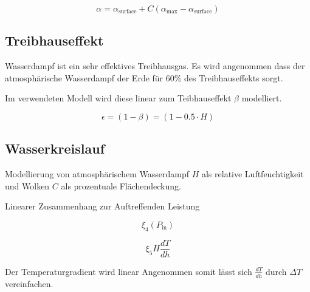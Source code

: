 \begin{refsection}
\begin{equation}
\alpha = \alpha_{\text{surface}} + C(\alpha_{\text{max}} - \alpha_{\text{surface}})
\end{equation}

\subsection{Treibhauseffekt}

Wasserdampf ist ein sehr effektives Treibhausgas. Es wird angenommen dass der atmosphärische Wasserdampf der Erde für 60\% des Treibhauseffekts sorgt.  


Im verwendeten Modell wird diese linear zum Teibhauseffekt $\beta$ modelliert.

\begin{equation}
\epsilon  = (1 - \beta) = (1 - 0.5 \cdot H)
\end{equation}

\subsection{Wasserkreislauf}



Modellierung von atmosphärischem Wasserdampf $H$ als relative Luftfeuchtigkeit und Wolken $C$ als prozentuale Flächendeckung.



Linearer Zusammenhang zur Auftreffenden Leistung

\begin{equation}
\xi_4 (P_{\text{in}})
\end{equation}


\begin{equation}
\xi_5 H \frac{dT}{dh}
\end{equation}

Der Temperaturgradient wird linear Angenommen somit lässt sich $\frac{dT}{dh}$ durch $\Delta T $ vereinfachen. 


\end{refsection}

